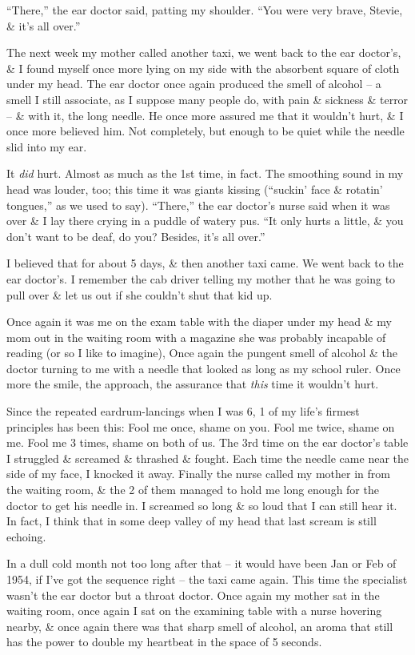 \documentclass{article}
\numberwithin{equation}{section}
\begin{document}
``There,'' the ear doctor said, patting my shoulder. ``You were very brave, Stevie, \& it's all over.''

The next week my mother called another taxi, we went back to the ear doctor's, \& I found myself once more lying on my side with the absorbent square of cloth under my head. The ear doctor once again produced the smell of alcohol -- a smell I still associate, as I suppose many people do, with pain \& sickness \& terror -- \& with it, the long needle. He once more assured me that it wouldn't hurt, \& I once more believed him. Not completely, but enough to be quiet while the needle slid into my ear.

It \textit{did} hurt. Almost as much as the 1st time, in fact. The smoothing sound in my head was louder, too; this time it was giants kissing (``suckin' face \& rotatin' tongues,'' as we used to say). ``There,'' the ear doctor's nurse said when it was over \& I lay there crying in a puddle of watery pus. ``It only hurts a little, \& you don't want to be deaf, do you? Besides, it's all over.''

I believed that for about 5 days, \& then another taxi came. We went back to the ear doctor's. I remember the cab driver telling my mother that he was going to pull over \& let us out if she couldn't shut that kid up.

Once again it was me on the exam table with the diaper under my head \& my mom out in the waiting room with a magazine she was probably incapable of reading (or so I like to imagine), Once again the pungent smell of alcohol \& the doctor turning to me with a needle that looked as long as my school ruler. Once more the smile, the approach, the assurance that \textit{this} time it wouldn't hurt.

Since the repeated eardrum-lancings when I was 6, 1 of my life's firmest principles has been this: Fool me once, shame on you. Fool me twice, shame on me. Fool me 3 times, shame on both of us. The 3rd time on the ear doctor's table I struggled \& screamed \& thrashed \& fought. Each time the needle came near the side of my face, I knocked it away. Finally the nurse called my mother in from the waiting room, \& the 2 of them managed to hold me long enough for the doctor to get his needle in. I screamed so long \& so loud that I can still hear it. In fact, I think that in some deep valley of my head that last scream is still echoing.

 In a dull cold month not too long after that -- it would have been Jan or Feb of 1954, if I've got the sequence right -- the taxi came again. This time the specialist wasn't the ear doctor but a throat doctor. Once again my mother sat in the waiting room, once again I sat on the examining table with a nurse hovering nearby, \& once again there was that sharp smell of alcohol, an aroma that still has the power to double my heartbeat in the space of 5 seconds.
\end{document}
